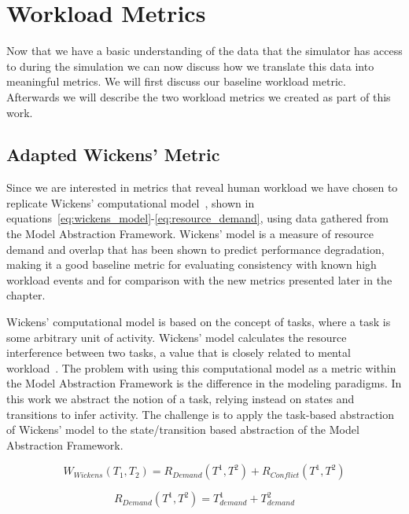 \chapter{Workload Metrics} \label{ch:workload}

Now that we have a basic understanding of the data that the simulator has access to during the simulation we can now discuss how we translate this data into meaningful metrics.  We will first discuss our baseline workload metric.  Afterwards we will describe the two workload metrics we created as part of this work.

\section{Adapted Wickens' Metric}
Since we are interested in metrics that reveal human workload we have chosen to replicate Wickens' computational model~\cite{wickens2002multiple}, shown in equations~\ref{eq:wickens_model}-\ref{eq:resource_demand}, using data gathered from the Model Abstraction Framework.  Wickens' model is a measure of resource demand and overlap that has been shown to predict performance degradation, making it a good baseline metric for evaluating consistency with known high workload events and for comparison with the new metrics presented later in the chapter.  

Wickens' computational model is based on the concept of tasks, where a task is some arbitrary unit of activity.  Wickens' model calculates the resource interference between two tasks, a value that is closely related to mental workload~\cite{wickens2002multiple}.  The problem with using this computational model as a metric within the Model Abstraction Framework is the difference in the modeling paradigms.  In this work we abstract the notion of a task, relying instead on states and transitions to infer activity.  The challenge is to apply the task-based abstraction of Wickens' model to the state/transition based abstraction of the Model Abstraction Framework.

\begin{equation}
  W_{Wickens}(T_{1}, T_{2}) = R_{Demand}(T^{1}, T^{2}) + R_{Conflict}(T^{1}, T^{2})
  \label{eq:wickens_model}
\end{equation}

\begin{equation}
  R_{Demand}(T^{1}, T^{2}) = T_{demand}^{1} + T_{demand}^{2}
  \label{eq:resource_demand}
\end{equation}

